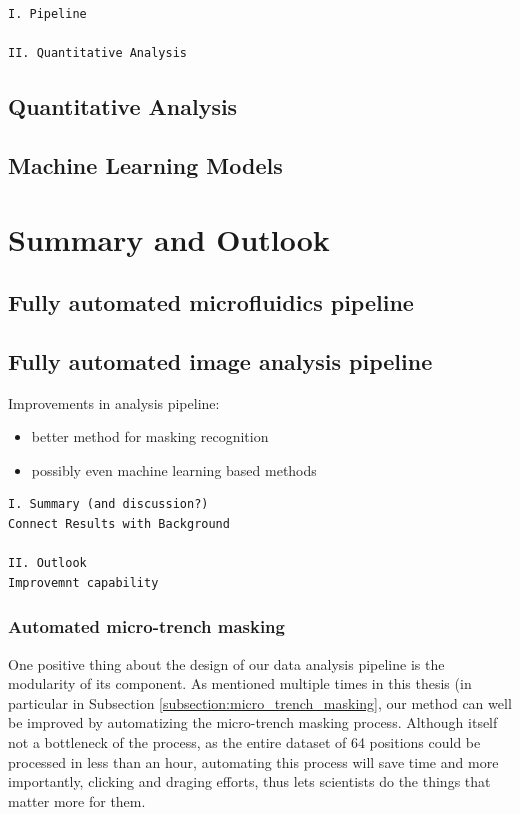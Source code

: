 \documentclass[pdftex,12pt,a4paper]{report}
\begin{document}
\begin{verbatim}
I. Pipeline

II. Quantitative Analysis
\end{verbatim}

\section{Quantitative Analysis}

\section{Machine Learning Models}

\chapter{Summary and Outlook}

\section{Fully automated microfluidics pipeline}

\section{Fully automated image analysis pipeline}

Improvements in analysis pipeline:

\begin{itemize}
\item better method for masking recognition
\item possibly even machine learning based methods
\end{itemize}

\begin{verbatim}
I. Summary (and discussion?)
Connect Results with Background

II. Outlook
Improvemnt capability
\end{verbatim}

\subsection{Automated micro-trench masking}

One positive thing about the design of our data analysis pipeline is the modularity of its component. As mentioned multiple times in this thesis (in particular in Subsection \ref{subsection:micro_trench_masking}, our method can well be improved by automatizing the micro-trench masking process. Although itself not a bottleneck of the process, as the entire dataset of 64 positions could be processed in less than an hour, automating this process will save time and more importantly, clicking and draging efforts, thus lets scientists do the things that matter more for them.
\end{document}
